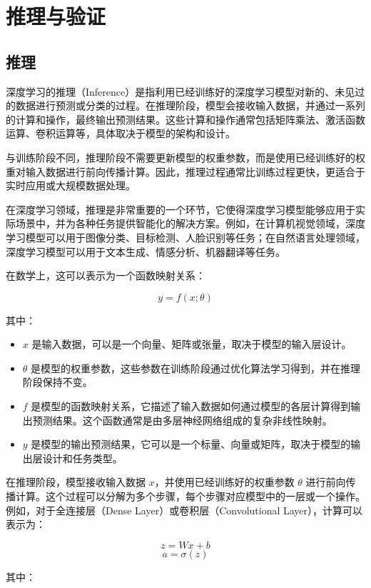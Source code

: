 \chapter{推理与验证}
\label{chapter:5}

\section{推理}

深度学习的推理（Inference）是指利用已经训练好的深度学习模型对新的、未见过的数据进行预测或分类的过程。在推理阶段，模型会接收输入数据，并通过一系列的计算和操作，最终输出预测结果。这些计算和操作通常包括矩阵乘法、激活函数运算、卷积运算等，具体取决于模型的架构和设计。

与训练阶段不同，推理阶段不需要更新模型的权重参数，而是使用已经训练好的权重对输入数据进行前向传播计算。因此，推理过程通常比训练过程更快，更适合于实时应用或大规模数据处理。

在深度学习领域，推理是非常重要的一个环节，它使得深度学习模型能够应用于实际场景中，并为各种任务提供智能化的解决方案。例如，在计算机视觉领域，深度学习模型可以用于图像分类、目标检测、人脸识别等任务；在自然语言处理领域，深度学习模型可以用于文本生成、情感分析、机器翻译等任务。

在数学上，这可以表示为一个函数映射关系：

\[ y = f(x; \theta) \]

其中：

\begin{itemize}
	\item $x$ 是输入数据，可以是一个向量、矩阵或张量，取决于模型的输入层设计。
	\item $\theta$ 是模型的权重参数，这些参数在训练阶段通过优化算法学习得到，并在推理阶段保持不变。
	\item $f$ 是模型的函数映射关系，它描述了输入数据如何通过模型的各层计算得到输出预测结果。这个函数通常是由多层神经网络组成的复杂非线性映射。
	\item $y$ 是模型的输出预测结果，它可以是一个标量、向量或矩阵，取决于模型的输出层设计和任务类型。
\end{itemize}

在推理阶段，模型接收输入数据 $x$，并使用已经训练好的权重参数 $\theta$ 进行前向传播计算。这个过程可以分解为多个步骤，每个步骤对应模型中的一层或一个操作。例如，对于全连接层（Dense Layer）或卷积层（Convolutional Layer），计算可以表示为：

\[ z = Wx + b \]
\[ a = \sigma(z) \]

其中：

